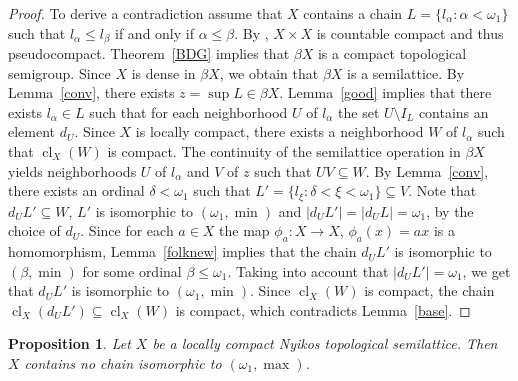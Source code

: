 \documentclass[12pt, twoside, leqno]{article}
\newtheorem{proposition}[theorem]{Proposition}
\theoremstyle{definition}
\numberwithin{equation}{section}
\newcommand{\w}{\omega}
\newcommand{\cl}{\operatorname{cl}}
\begin{document}
\begin{proof}
To derive a contradiction assume that $X$ contains a chain $L=\{l_{\alpha}:\alpha<\w_1\}$ such that $l_{\alpha}\leq l_{\beta}$ if and only if $\alpha\leq \beta$. By \cite[Corollary 3.10.15]{Eng}, $X{\times}X$ is countable compact and thus pseudocompact. Theorem~\ref{BDG} implies that $\beta X$ is a compact topological semigroup. Since $X$ is dense in $\beta X$, we obtain that $\beta X$ is a semilattice. By Lemma~\ref{conv}, there exists $z=\sup L\in\beta X$.  
Lemma~\ref{good} implies that there exists $l_{\alpha}\in L$ such that for each neighborhood $U$ of $l_{\alpha}$ the set $U\setminus I_L$ contains an element $d_U$.
Since $X$ is locally compact, there exists a neighborhood $W$ of $l_{\alpha}$ such that $\cl_X(W)$ is compact.
 The continuity of the semilattice operation in $\beta X$ yields neighborhoods $U$ of $l_{\alpha}$ and $V$ of $z$ such that $UV\subseteq W$.
 By Lemma~\ref{conv}, there exists an ordinal $\delta<\w_1$ such that 
 $L'=\{l_{\xi}:\delta<\xi <\w_1\}\subseteq V$. Note that $d_UL'\subseteq W$, $L'$ is isomorphic to $(\w_1,\min)$ and $|d_UL'|=|d_UL|=\w_1$, by the choice of $d_U$. Since for each $a\in X$ the map $\phi_a: X\rightarrow X$, $\phi_a(x)=ax$ is a homomorphism, Lemma~\ref{folknew} implies that the chain $d_UL'$ is isomorphic to $(\beta,\min)$ for some ordinal $\beta\leq \w_1$. Taking into account that $|d_UL'|=\w_1$, we get that $d_UL'$ is isomorphic to $(\w_1,\min)$. Since $\cl_X(W)$ is compact, the chain $\cl_X(d_UL')\subseteq \cl_X(W)$ is compact, which contradicts Lemma~\ref{base}. 
\end{proof}


\begin{proposition}\label{w2}
Let $X$ be a locally compact Nyikos topological semilattice. Then $X$ contains no chain isomorphic to $(\w_1,\max)$.      
\end{proposition}
\end{document}
